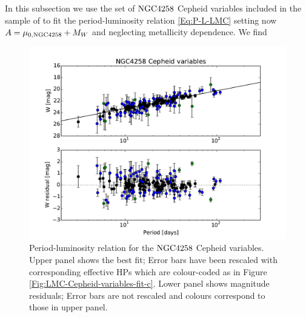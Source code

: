 In this subsection we use the set of $\mathrm{NGC4258}$ Cepheid variables included in the sample of \cite{Riess:2011yx} to fit the period-luminosity relation \eqref{Eq:P-L-LMC} setting now $A = \mu_{0, \mathrm{NGC4258}} + M_W$ and neglecting metallicity dependence. We find
\begin{figure}[tbp]
\centering %
\includegraphics[scale=0.75]{figures/chapter-h0/effective_HP_cepheids_NGC4258.pdf} 
\caption{Period-luminosity relation for the $\mathrm{NGC4258}$ Cepheid variables. Upper panel shows the best fit; Error bars have been rescaled with corresponding effective HPs which are colour-coded as in Figure \ref{Fig:LMC-Cepheid-variables-fit-c}. Lower panel shows magnitude residuals; Error bars are not rescaled and colours correspond to those in upper panel.}
\label{Fig:NGC4258-Cepheid-variables}
\end{figure}

